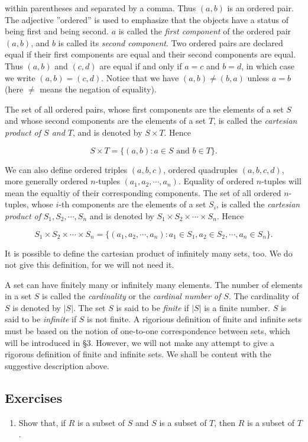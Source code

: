 \documentclass[11pt]{amsbook}
\begin{document}

within parentheses and separated by a comma. Thus $(a,b)$ is an ordered pair. The adjective ''ordered'' is used to emphasize that the objects 
have a status of being first and being second. $a$ is called the \textit{first component} of the ordered pair $(a,b)$, and $b$ is called its \textit{second component}. 
Two ordered pairs are declared equal if their first components are equal and their second components are equal. Thus $(a,b)$ and $(c,d)$ are equal if and only if 
$a = c$ and $b = d$, in which case we write $(a,b) = (c,d)$. Notice that we have $(a,b) \neq (b,a)$ unless $a = b$ (here $\neq$ means the negation of equality).

The set of all ordered pairs, whose first components are the elements of a set $S$ and whose second components are the elements of a set $T$, is called the 
\textit{cartesian product of $S$ and $T$}, and is denoted by $S \times T$. Hence

\begin{equation*}
	S \times T = \{(a,b): a \in S \text{ and } b \in T\}.
\end{equation*}

We can also define ordered triples $(a,b,c)$, ordered quadruples $(a,b,c,d)$, more generally ordered $n$-tuples $(a_{1}, a_{2},\cdots, a_{n})$. Equality of ordered 
$n$-tuples will mean the equaltiy of their corresponding components. The set of all ordered $n$-tuples, whose $i$-th components are the elements of a set $S_{i}$, 
is called the \textit{cartesian product of } $S_{1}, S_{2}, \cdots, S_{n}$ and is denoted by $S_{1} \times S_{2} \times \cdots \times S_{n}$. Hence

\begin{equation*}
	S_{1} \times S_{2} \times \cdots \times S_{n} = \{(a_{1}, a_{2}, \cdots, a_{n}): a_{1} \in S_{1}, a_{2} \in S_{2}, \cdots,  a_{n} \in S_{n}\}. 
\end{equation*}

It is possible to define the cartesian product of infinitely many sets, too. We do not give this definition, for we will not need it. 

A set can have finitely many or infinitely many elements. The number of elements in a set $S$ is called the \textit{cardinality} or the \textit{cardinal number of $S$}. 
The cardinality of $S$ is denoted by $|S|$. The set $S$ is said to be \textit{finite} if $|S|$ is a finite number. $S$ is said to be \textit{infinite} if $S$ is not finite. 
A rigorious definition of finite and infinite sets must be based on the notion of one-to-one correspondence between sets, which will be introduced in §3. However, 
we will not make any attempt to give a rigorous definition of finite and infinite sets. We shall be content with the suggestive description above.

\subsection*{Exercises}

\begin{enumerate}
	\item Show that, if $R$ is a subset of $S$ and $S$ is a subset of $T$, then $R$ is a subset of $T$.
\end{enumerate}

\end{document}
